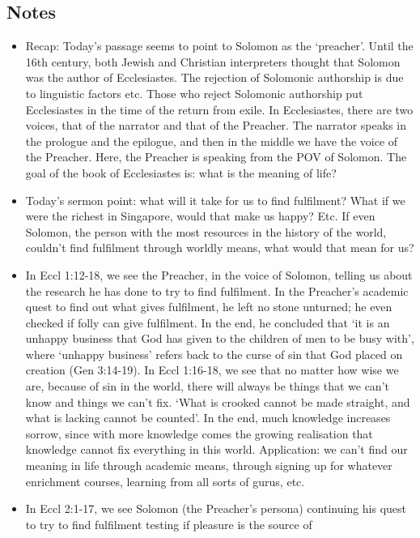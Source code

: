 \subsection*{Notes}
\begin{itemize}
  \item{Recap: Today's passage seems to point to Solomon as the `preacher'.
  Until the 16th century, both Jewish and Christian interpreters thought that
  Solomon was the author of Ecclesiastes.  The rejection of Solomonic
  authorship is due to linguistic factors etc.  Those who reject Solomonic
  authorship put Ecclesiastes in the time of the return from exile.  In
  Ecclesiastes, there are two voices, that of the narrator and that of the
  Preacher.  The narrator speaks in the prologue and the epilogue, and then
  in the middle we have the voice of the Preacher.  Here, the Preacher is
  speaking from the POV of Solomon.  The goal of the book of Ecclesiastes is:
  what is the meaning of life?}
  \item{Today's sermon point: what will it take for us to find fulfilment?
  What if we were the richest in Singapore, would that make us happy?  Etc.
  If even Solomon, the person with the most resources in the history of the
  world, couldn't find fulfilment through worldly means, what would that mean
  for us?}
  \item{In Eccl 1:12-18, we see the Preacher, in the voice of Solomon,
  telling us about the research he has done to try to find fulfilment.  In
  the Preacher's academic quest to find out what gives fulfilment, he left no
  stone unturned; he even checked if folly can give fulfilment.  In the end,
  he concluded that `it is an unhappy business that God has given to the
  children of men to be busy with', where `unhappy business' refers back to
  the curse of sin that God placed on creation (Gen 3:14-19).  In
  Eccl 1:16-18, we see that no matter how wise we are, because of sin in the
  world, there will always be things that we can't know and things we can't
  fix.  `What is crooked cannot be made straight, and what is lacking cannot
  be counted'.  In the end, much knowledge increases sorrow, since with more
  knowledge comes the growing realisation that knowledge cannot fix
  everything in this world.  Application: we can't find our meaning in life
  through academic means, through signing up for whatever enrichment courses,
  learning from all sorts of gurus, etc.}
  \item{In Eccl 2:1-17, we see Solomon (the Preacher's persona) continuing
  his quest to try to find fulfilment testing if pleasure is the source of
}
\end{itemize}
